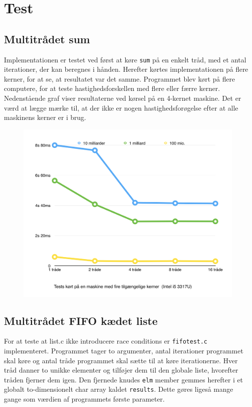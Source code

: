 \section{Test}

\subsection{Multitrådet sum}
Implementationen er testet ved først at køre \texttt{sum} på en enkelt tråd, med et antal iterationer, der kan beregnes i hånden.
Herefter kørtes implementationen på flere kerner, for at se, at resultatet var det samme. 
Programmet blev kørt på flere computere, for at teste hastighedsforskellen med flere eller færre kerner. 
Nedenstående graf viser resultaterne ved kørsel på en 4-kernet maskine. Det er værd at lægge mærke til, at der ikke er nogen hastighedsforøgelse efter at alle maskinens kerner er i brug. 

\begin{figure}[h!]
\center
\includegraphics[width=\linewidth]{figures/graph.png}
\end{figure}

\subsection{Multitrådet FIFO kædet liste}
For at teste at list.c ikke introducere race conditions er \texttt{fifotest.c} implementeret. Programmet tager to argumenter, antal iterationer programmet skal køre og antal tråde programmet skal sætte til at køre iterationerne. Hver tråd danner to unikke elementer og tilføjer dem til den globale liste, hvorefter tråden fjerner dem igen. Den fjernede knudes \texttt{elm} member gemmes herefter i et globalt to-dimensionelt char array kaldet \texttt{results}. Dette gøres ligeså mange gange som værdien af programmets første parameter. \\


